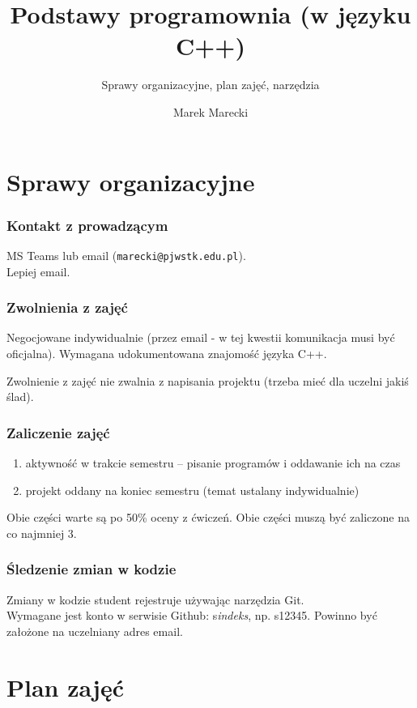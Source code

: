 \documentclass[aspectratio=169]{beamer}
\title{Podstawy programownia (w języku C++)}
\subtitle{Sprawy organizacyjne, plan zajęć, narzędzia}
\author{Marek Marecki}
\institute{Polsko-Japońska Akademia Technik Komputerowych}
\begin{document}
{%
    \frame{\titlepage}
}

\section{Sprawy organizacyjne}

\begin{frame}
    \frametitle{Kontakt z prowadzącym}

    MS Teams lub email ({\tt marecki@pjwstk.edu.pl}).\\
    Lepiej email.
\end{frame}

\begin{frame}
    \frametitle{Zwolnienia z zajęć}

    Negocjowane indywidualnie (przez email - w tej kwestii komunikacja musi być
    oficjalna).
    Wymagana udokumentowana znajomość języka C++.

    \vspace{1em}

    Zwolnienie z zajęć nie zwalnia z napisania projektu (trzeba mieć dla uczelni
    jakiś ślad).
\end{frame}

\begin{frame}
    \frametitle{Zaliczenie zajęć}

    \begin{enumerate}
        \item aktywność w trakcie semestru -- pisanie programów i oddawanie ich
            na czas
        \item projekt oddany na koniec semestru (temat ustalany indywidualnie)
    \end{enumerate}

    \vspace{1em}

    Obie części warte są po 50\% oceny z ćwiczeń. Obie części muszą być
    zaliczone na co najmniej 3.
\end{frame}

\begin{frame}
    \frametitle{Śledzenie zmian w kodzie}

    Zmiany w kodzie student rejestruje używając narzędzia Git.\\
    Wymagane jest konto w serwisie Github: s\emph{indeks}, np. s12345. Powinno
    być założone na uczelniany adres email.
\end{frame}

\section{Plan zajęć}
\end{document}
